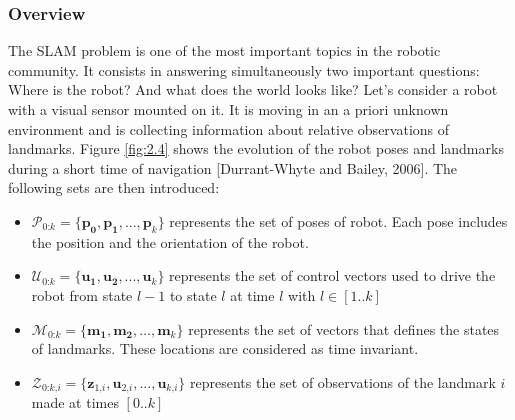\subsubsection{Overview}
The SLAM problem is one of the most important topics in the robotic community. It
consists in answering simultaneously two important questions: Where is the robot? And
what does the world looks like? Let’s consider a robot with a visual sensor mounted on
it. It is moving in an a priori unknown environment and is collecting information about
relative observations of landmarks. Figure \ref{fig:2.4} shows the evolution of the robot poses
and landmarks during a short time of navigation [Durrant-Whyte and Bailey, 2006]. The
following sets are then introduced:
\begin{itemize}
    \item $\mathcal{P_\textit{0:k}}=\{\mathbf{p_0},\mathbf{p_1},...,\mathbf{p_\textit{k}}\}$ represents the set of poses of robot. Each pose includes the position and the orientation of the robot.
    \item $\mathcal{U_\textit{0:k}}=\{\mathbf{u_1},\mathbf{u_2},...,\mathbf{u_\textit{k}}\}$ represents the set of control vectors used to drive the robot from state $\textit{l}-1$ to state $\textit{l}$ at time $\textit{l}$ with $\textit{l} \in [1..\textit{k}]$
    \item $\mathcal{M_\textit{0:k}}=\{\mathbf{m_1},\mathbf{m_2},...,\mathbf{m_\textit{k}}\}$ represents the set of vectors that defines the states of landmarks. These locations are considered as time invariant.
    \item $\mathcal{Z_\textit{0:k,i}}=\{\mathbf{z_\textit{1,i}},\mathbf{u_\textit{2,i}},...,\mathbf{u_\textit{k,i}}\}$ represents the set of observations of the landmark $\textit{i}$ made at times $[0..\textit{k}]$
\end{itemize}

